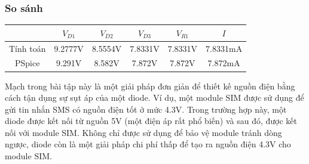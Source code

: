 \subsubsection{So sánh}


\begin{table}[H]
\centering

\begin{tabular}{|c|c|c|c|c|c|}
\hline
     & $V_{D1}$ & $V_{D2}$ & $V_{D3}$ & $V_{R1}$ & $I$  \\ \hline
Tính toán & 9.2777V &8.5554V &7.8331V &7.8331V &7.8331mA\\ \hline
PSpice      &9.291V &8.582V &7.872V &7.872V &7.872mA \\ \hline
\end{tabular}
\end{table}

Mạch trong bài tập này là một giải pháp đơn giản để thiết kế nguồn điện bằng cách tận dụng sự sụt áp của một diode. Ví dụ, một module SIM được sử dụng để gửi tin nhắn SMS có nguồn điện tốt ở mức 4.3V. Trong trường hợp này, một diode được kết nối từ nguồn 5V (một điện áp rất phổ biến) và sau đó, được kết nối với module SIM. Không chỉ được sử dụng để bảo vệ module tránh dòng ngược, diode còn là một giải pháp chi phí thấp để tạo ra nguồn điện 4.3V cho module SIM.
